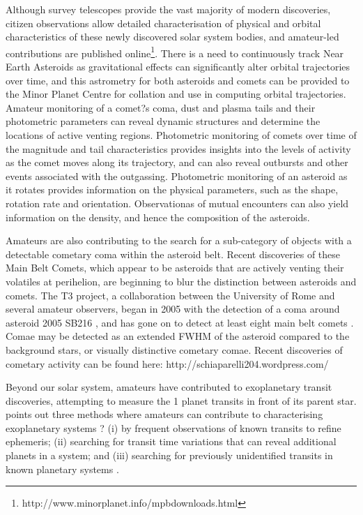 \documentclass{ar2e}
\begin{document}
Although survey telescopes provide the vast majority of modern discoveries,
citizen observations allow detailed characterisation of physical and orbital
characteristics of these newly discovered solar system bodies, and amateur-led
contributions are published
online\footnote{http://www.minorplanet.info/mpbdownloads.html}.  There is a
need to continuously track Near Earth Asteroids as gravitational effects can
significantly alter orbital trajectories over time, and this astrometry for
both asteroids and comets can be provided to the Minor Planet Centre for
collation and use in computing orbital trajectories.  Amateur monitoring of a
comet?s coma, dust and plasma tails and their photometric parameters can
reveal dynamic structures and determine the locations of active venting
regions.  Photometric monitoring of comets over time of the magnitude and tail
characteristics provides insights into the levels of activity as the comet
moves along its trajectory, and can also reveal outbursts and other events
associated with the outgassing.  Photometric monitoring of an asteroid as it
rotates provides information on the physical parameters, such as the shape,
rotation rate and orientation.  Observationas of mutual encounters can also
yield information on the density, and hence the composition of the asteroids.

Amateurs are also contributing to the search for a sub-category of objects
with a detectable cometary coma within the asteroid belt.  Recent discoveries
of these Main Belt Comets, which appear to be asteroids that are actively
venting their volatiles at perihelion, are beginning to blur the distinction
between asteroids and comets.  The T3 project, a collaboration between the
University of Rome and several amateur observers, began in 2005 with the
detection of a coma around asteroid 2005 SB216 \citep{05buzzi}, and has gone
on to detect at least eight main belt comets \citep{13mousis}. Comae may be
detected as an extended FWHM of the asteroid compared to the background stars,
or visually distinctive cometary comae.  Recent discoveries of cometary
activity can be found here: http://schiaparelli204.wordpress.com/

Beyond our solar system, amateurs have contributed to exoplanetary transit
discoveries,  attempting to measure the 1%
planet transits in front of its parent star. \citet{13mousis} points out three
methods where amateurs can contribute to characterising exoplanetary systems ?
(i) by frequent observations of known transits to refine ephemeris; (ii)
searching for transit time variations that can reveal additional planets in a
system; and (iii) searching for previously unidentified transits in known
planetary systems \citep[e.g., the discovery of the transit of HD 80606b from
a 30 cm telescope near London,][]{09fossey}.
 
\end{document}

